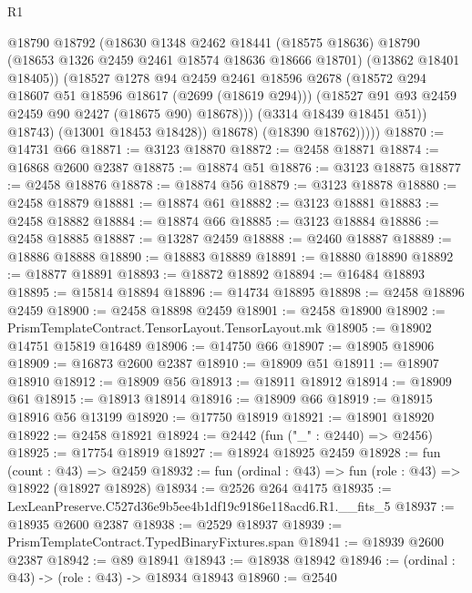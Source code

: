 \begin{lexlean}{R1}
\begin{coremodule}
                      @18790
                      @18792
                      (@18630
                        @1348
                        @2462
                        @18441
                        (@18575 @18636)
                        @18790
                        (@18653 @1326 @2459 @2461 @18574 @18636 @18666 @18701)
                        (@13862 @18401 @18405))
                      (@18527
                        @1278
                        @94
                        @2459
                        @2461
                        @18596
                        @2678
                        (@18572 @294 @18607 @51 @18596 @18617 (@2699 (@18619 @294)))
                        (@18527 @91 @93 @2459 @2459 @90 @2427 (@18675 @90) @18678)))
                    (@3314 @18439 @18451 @51))
                  @18743)
                (@13001 @18453 @18428))
              @18678)
            (@18390 @18762)))))
@18870 := @14731 @66
@18871 := @3123 @18870
@18872 := @2458 @18871
@18874 := @16868 @2600 @2387
@18875 := @18874 @51
@18876 := @3123 @18875
@18877 := @2458 @18876
@18878 := @18874 @56
@18879 := @3123 @18878
@18880 := @2458 @18879
@18881 := @18874 @61
@18882 := @3123 @18881
@18883 := @2458 @18882
@18884 := @18874 @66
@18885 := @3123 @18884
@18886 := @2458 @18885
@18887 := @13287 @2459
@18888 := @2460 @18887
@18889 := @18886 @18888
@18890 := @18883 @18889
@18891 := @18880 @18890
@18892 := @18877 @18891
@18893 := @18872 @18892
@18894 := @16484 @18893
@18895 := @15814 @18894
@18896 := @14734 @18895
@18898 := @2458 @18896 @2459
@18900 := @2458 @18898 @2459
@18901 := @2458 @18900
@18902 := PrismTemplateContract.TensorLayout.TensorLayout.mk
@18905 := @18902 @14751 @15819 @16489
@18906 := @14750 @66
@18907 := @18905 @18906
@18909 := @16873 @2600 @2387
@18910 := @18909 @51
@18911 := @18907 @18910
@18912 := @18909 @56
@18913 := @18911 @18912
@18914 := @18909 @61
@18915 := @18913 @18914
@18916 := @18909 @66
@18919 := @18915 @18916 @56 @13199
@18920 := @17750 @18919
@18921 := @18901 @18920
@18922 := @2458 @18921
@18924 := @2442 (fun ("_" : @2440) => @2456)
@18925 := @17754 @18919
@18927 := @18924 @18925 @2459
@18928 := fun (count : @43) => @2459
@18932 := fun (ordinal : @43) => fun (role : @43) => @18922 (@18927 @18928)
@18934 := @2526 @264 @4175
@18935 := LexLeanPreserve.C527d36e9b5ee4b1df19c9186e118acd6.R1.__fits_5
@18937 := @18935 @2600 @2387
@18938 := @2529 @18937
@18939 := PrismTemplateContract.TypedBinaryFixtures.span
@18941 := @18939 @2600 @2387
@18942 := @89 @18941
@18943 := @18938 @18942
@18946 := (ordinal : @43) -> (role : @43) -> @18934 @18943
@18960 := @2540

\end{coremodule}
\end{lexlean}
